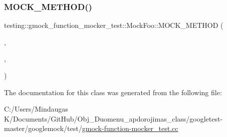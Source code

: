 \mbox{\label{classtesting_1_1gmock__function__mocker__test_1_1_mock_foo_a887e304dcf8658b35634a7a547fad991}} 
\subsubsection{\texorpdfstring{MOCK\_METHOD()}{MOCK\_METHOD()}\hspace{0.1cm}{\footnotesize\ttfamily [38/38]}}
{\footnotesize\ttfamily testing\+::gmock\+\_\+function\+\_\+mocker\+\_\+test\+::\+Mock\+Foo\+::\+M\+O\+C\+K\+\_\+\+M\+E\+T\+H\+OD (\begin{DoxyParamCaption}\item[{int}]{,  }\item[{\mbox{\hyperlink{classtesting_1_1gmock__function__mocker__test_1_1_foo_interface_af9e3190c69647229baed1dba41c2fdf8}{Type\+With\+Templated\+Copy\+Ctor}}}]{,  }\item[{(const \mbox{\hyperlink{classtesting_1_1gmock__function__mocker__test_1_1_templated_copyable}{Templated\+Copyable}}$<$ int $>$ \&)}]{ }\end{DoxyParamCaption})}



The documentation for this class was generated from the following file\+:\begin{DoxyCompactItemize}
\item 
C\+:/\+Users/\+Mindaugas K/\+Documents/\+Git\+Hub/\+Obj\+\_\+\+Duomenu\+\_\+apdorojimas\+\_\+class/googletest-\/master/googlemock/test/\mbox{\hyperlink{googletest-master_2googlemock_2test_2gmock-function-mocker__test_8cc}{gmock-\/function-\/mocker\+\_\+test.\+cc}}\end{DoxyCompactItemize}
